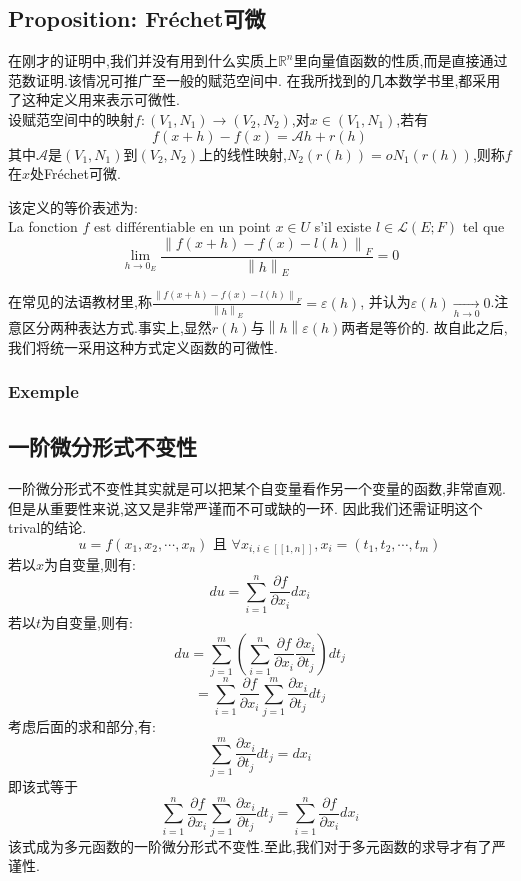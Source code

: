 \documentclass[12pt, a4paper, oneside]{ctexbook}
\begin{document}
    \subsection{Proposition: Fréchet可微}
    在刚才的证明中,我们并没有用到什么实质上$\mathbb{R}^n$里向量值函数的性质,而是直接通过范数证明.该情况可推广至一般的赋范空间中.
    在我所找到的几本数学书里,都采用了这种定义用来表示可微性.\\

    设赋范空间中的映射$f:(V_1,N_1)\rightarrow (V_2,N_2)$,对$x\in (V_1,N_1)$,若有
    $$
      f(x+h)-f(x)=\mathcal{A} h+r(h)
    $$
    其中$\mathcal{A}$是$(V_1,N_1)$到$ (V_2,N_2)$上的线性映射,$N_2(r(h))=oN_1(r(h))$,则称$f$在$x$处Fréchet可微.
    

    该定义的等价表述为:\\

    La fonction $f$ est différentiable en un point $x\in U$ s'il existe $l\in \mathcal{L}(E; F) $ tel que 
    $$
      \lim_{h \to 0_E}\frac{\left\lVert f(x+h)-f(x)-l(h)\right\rVert _F }{\left\lVert h\right\rVert _E}  =0
    $$
    
    
    在常见的法语教材里,称$\frac{\left\lVert f(x+h)-f(x)-l(h)\right\rVert _F }{\left\lVert h\right\rVert _E}  =\varepsilon (h)$,
    并认为$\varepsilon (h)\xrightarrow[h\rightarrow 0]{}0$.注意区分两种表达方式.事实上,显然$r(h)$与$\left\lVert h\right\rVert\varepsilon (h)$两者是等价的.
    故自此之后,我们将统一采用这种方式定义函数的可微性.
    \subsubsection{Exemple}
    
    \subsection{一阶微分形式不变性}
    一阶微分形式不变性其实就是可以把某个自变量看作另一个变量的函数,非常直观.但是从重要性来说,这又是非常严谨而不可或缺的一环.
    因此我们还需证明这个trival的结论.
    $$
    u=f(x_1,x_2,\cdots,x_n) \text{ 且 }\forall x_{i,i\in [\![1,n]\!]}, x_i=(t_1,t_2,\cdots,t_m)
    $$
    若以$x$为自变量,则有:
    $$
      du=\sum_{i=1}^{n}\frac{\partial f}{\partial x_i}dx_i
    $$
    若以$t$为自变量,则有:
    $$
      du=\sum_{j=1}^{m}(\sum_{i=1}^{n}\frac{\partial f}{\partial x_i}\frac{\partial x_i}{\partial t_j})dt_j
    $$
    $$
      =\sum_{i=1}^{n}\frac{\partial f}{\partial x_i}\sum_{j=1}^{m}\frac{\partial x_i}{\partial t_j}dt_j
    $$
    考虑后面的求和部分,有:
    $$
    \sum_{j=1}^{m}\frac{\partial x_i}{\partial t_j}dt_j=dx_i
    $$
    即该式等于
    $$
    \sum_{i=1}^{n}\frac{\partial f}{\partial x_i}\sum_{j=1}^{m}\frac{\partial x_i}{\partial t_j}dt_j = \sum_{i=1}^{n}\frac{\partial f}{\partial x_i}dx_i
    $$
    该式成为多元函数的一阶微分形式不变性.至此,我们对于多元函数的求导才有了严谨性.
\end{document}

